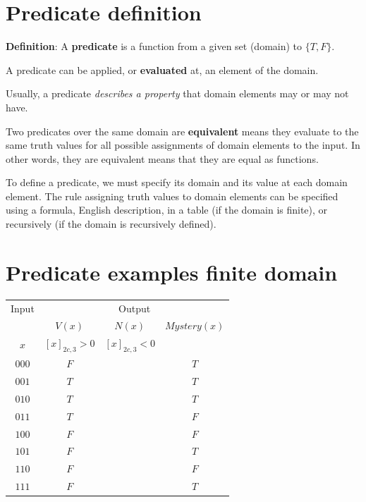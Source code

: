 \documentclass[12pt, oneside]{article}
\begin{document}
\begin{flushright}
\end{flushright} \section*{Predicate definition}


{\bf  Definition}: A  {\bf predicate}  is  a function from a given set (domain) to $\{T,F\}$.

A predicate can be applied, or {\bf evaluated} at, an element of the domain.

Usually, a predicate {\it describes a  property} that domain elements may or may not have.

Two predicates over the same domain are {\bf equivalent} means they evaluate to
the same truth values for all possible assignments of domain elements to the
input. In other words, they are equivalent means that they are equal as functions.

To define a predicate, we must specify its domain and its value at each domain element.
The rule assigning truth values to domain elements can be specified using a formula, 
English description, in a table (if the domain is finite), or recursively (if the domain is recursively
defined). \vfill
\section*{Predicate examples finite domain}


\begin{center}
    \begin{tabular}{c||c|c|c}
    Input & \multicolumn{3}{c}{Output} \\
    &$V(x)$ & $N(x)$ & $Mystery(x)$\\
    $x$ & $[x]_{2c,3} > 0$ & $[x]_{2c,3} < 0$& \\
    \hline
    $000$  & $F$ & & $T$\\
    $001$  & $T$ & & $T$\\
    $010$  & $T$ & & $T$\\
    $011$  & $T$ & & $F$\\
    $100$  & $F$ & & $F$\\
    $101$  & $F$ & & $T$\\
    $110$  & $F$ & & $F$\\
    $111$  & $F$ & & $T$\\
    \end{tabular}
    \end{center}
    
\end{document}
